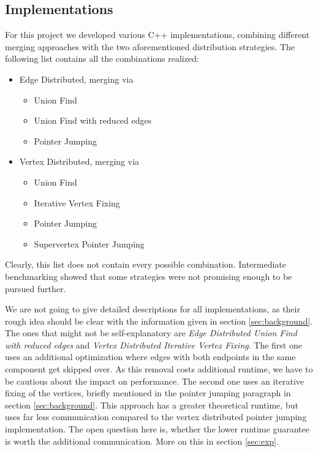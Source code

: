 \documentclass[letterpaper]{article}
\begin{document}
\subsection{Implementations}
\label{sec:implementations}
For this project we developed various C++ implementations, combining different merging approaches with the two
aforementioned distribution strategies. The following list contains all the combinations realized:
\begin{itemize}
  \item Edge Distributed, merging via
  \begin{itemize}
     \item Union Find 
     \item Union Find with reduced edges
     \item Pointer Jumping
  \end{itemize}
  \item Vertex Distributed, merging via
  \begin{itemize}
     \item Union Find 
     \item Iterative Vertex Fixing
     \item Pointer Jumping
     \item Supervertex Pointer Jumping
  \end{itemize}
\end{itemize}
Clearly, this list does not contain every possible combination. Intermediate benchmarking showed that some strategies
were not promising enough to be pursued further.

We are not going to give detailed descriptions for all implementations, as their rough idea should be clear with the
information given in section \ref{sec:background}. The ones that might not be self-explanatory are \emph{Edge
Distributed Union Find with reduced edges} and \emph{Vertex Distributed Iterative Vertex Fixing}. The first one uses
an additional optimization where edges with both endpoints in the same component get skipped over. As this removal costs
additional runtime, we have to be cautious about the impact on performance. The second one uses an iterative fixing of
the vertices, briefly mentioned in the pointer jumping paragraph in section \ref{sec:background}. This approach has a
greater theoretical runtime, but uses far less communication compared to the vertex distributed pointer jumping
implementation. The open question here is, whether the lower runtime guarantee is worth the additional communication.
More on this in section \ref{sec:exp}. %
\end{document}

